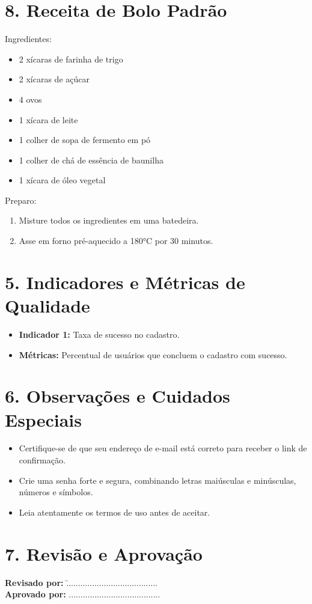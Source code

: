 \documentclass[a4paper,12pt]{article}
\begin{document}
\section*{8. Receita de Bolo Padrão}
Ingredientes:
\begin{itemize}
    \item 2 xícaras de farinha de trigo
    \item 2 xícaras de açúcar
    \item 4 ovos
    \item 1 xícara de leite
    \item 1 colher de sopa de fermento em pó
    \item 1 colher de chá de essência de baunilha
    \item 1 xícara de óleo vegetal
\end{itemize}
Preparo:
\begin{enumerate}
    \item Misture todos os ingredientes em uma batedeira.
    \item Asse em forno pré-aquecido a 180°C por 30 minutos.
\end{enumerate}

\section*{5. Indicadores e Métricas de Qualidade}
\begin{itemize}
    \item \textbf{Indicador 1:} Taxa de sucesso no cadastro.
    \item \textbf{Métricas:} Percentual de usuários que concluem o cadastro com sucesso.
\end{itemize}

\section*{6. Observações e Cuidados Especiais}
\begin{itemize}
    \item Certifique-se de que seu endereço de e-mail está correto para receber o link de confirmação.
    \item Crie uma senha forte e segura, combinando letras maiúsculas e minúsculas, números e símbolos.
    \item Leia atentamente os termos de uso antes de aceitar.
\end{itemize}

\section*{7. Revisão e Aprovação}
\begin{tabbing}
    \hspace{5cm} \= \textbf{Revisado por:} \hspace{2cm} \= ....................................... \\
    \hspace{5cm} \> \textbf{Aprovado por:} \> ....................................... \\
\end{tabbing}
\end{document}

